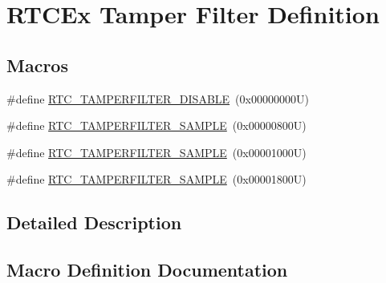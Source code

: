 \hypertarget{group___r_t_c_ex___tamper___filter___definitions}{}\section{R\+T\+C\+Ex Tamper Filter Definition}
\label{group___r_t_c_ex___tamper___filter___definitions}
\subsection*{Macros}
\begin{DoxyCompactItemize}
\item 
\#define \hyperlink{group___r_t_c_ex___tamper___filter___definitions_ga0809aebfef5642f8f2a8d04b0aed4d98}{R\+T\+C\+\_\+\+T\+A\+M\+P\+E\+R\+F\+I\+L\+T\+E\+R\+\_\+\+D\+I\+S\+A\+B\+LE}~(0x00000000\+U)
\item 
\#define \hyperlink{group___r_t_c_ex___tamper___filter___definitions_ga4338b957d061fa9d1d51d403275fe391}{R\+T\+C\+\_\+\+T\+A\+M\+P\+E\+R\+F\+I\+L\+T\+E\+R\+\_\+S\+A\+M\+P\+LE}~(0x00000800\+U)
\item 
\#define \hyperlink{group___r_t_c_ex___tamper___filter___definitions_gabd9f9f1c669c073d58bd71257faa079e}{R\+T\+C\+\_\+\+T\+A\+M\+P\+E\+R\+F\+I\+L\+T\+E\+R\+\_\+S\+A\+M\+P\+LE}~(0x00001000\+U)
\item 
\#define \hyperlink{group___r_t_c_ex___tamper___filter___definitions_ga3689ed6d70107f0acc92aae8b13600bd}{R\+T\+C\+\_\+\+T\+A\+M\+P\+E\+R\+F\+I\+L\+T\+E\+R\+\_\+S\+A\+M\+P\+LE}~(0x00001800\+U)
\end{DoxyCompactItemize}


\subsection{Detailed Description}


\subsection{Macro Definition Documentation}
\mbox{\label{group___r_t_c_ex___tamper___filter___definitions_ga4338b957d061fa9d1d51d403275fe391}} 
